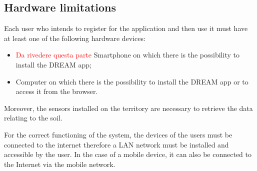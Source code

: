 \subsection{Hardware limitations}

Each user who intends to register for the application and then use it must have at least one of the following hardware devices:
\begin{itemize}
    \item \textcolor{red}{Da rivedere questa parte} Smartphone on which there is the possibility to install the DREAM app;
    \item Computer on which there is the possibility to install the DREAM app or to access it from the browser.
\end{itemize}

Moreover, the sensors installed on the territory are necessary to retrieve the data relating to the soil.

For the correct functioning of the system, the devices of the users must be connected to the internet therefore a LAN network must be installed and accessible by the user. In the case of a mobile device, it can also be connected to the Internet via the mobile network.